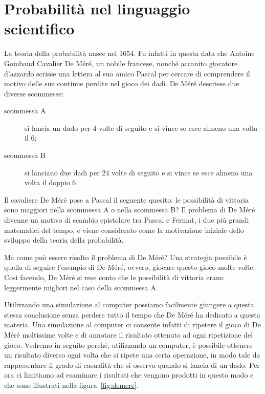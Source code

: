 \section{Probabilità nel linguaggio scientifico}


La teoria della probabilità nasce nel 1654. 
Fu infatti in questa data che Antoine Gombaud Cavalier De Méré, un nobile francese, nonché accanito giocatore d'azzardo scrisse una lettera al suo amico Pascal per cercare di comprendere il motivo delle sue continue perdite nel gioco dei dadi.
De Méré descrisse due diverse scommesse: 

\begin{description}
\item[scommessa A] si lancia un dado per 4 volte di seguito e si vince se esce almeno una volta il 6;
\item[scommessa B] si lanciano due dadi per 24 volte di seguito e si vince se esce almeno una volta il doppio 6.
\end{description}
Il cavaliere De Méré pose a Pascal il seguente quesito: le possibilità di vittoria sono maggiori nella scommessa A o nella scommessa B?
Il problema di De Méré divenne un motivo di scambio epistolare tra Pascal e Fermat, i due più grandi matematici del tempo, e viene considerato come la motivazione iniziale dello sviluppo  della teoria della probabilità.

Ma come può essere risolto il problema di De Méré?
Una strategia possibile è quella di seguire l'esempio di De Méré, ovvero, giocare questo gioco molte volte.
Così facendo, De Méré si rese conto che le possibilità di vittoria erano leggermente migliori nel caso della scommessa A.

Utilizzando una simulazione al computer possiamo facilmente giungere a questa stessa conclusione senza perdere tutto il tempo che De Méré ha dedicato a questa materia.
Una simulazione al computer ci consente infatti di ripetere il gioco di De Méré moltissime volte e di annotare il risultato ottenuto ad ogni ripetizione del gioco.
Vedremo in seguito perché, utilizzando un computer, è possibile ottenere un risultato diverso ogni volta che si ripete una certa operazione, in modo tale da rappresentare il grado di casualità che si osserva quando si lancia di un dado.
Per ora ci limitiamo ad esaminare i risultati che vengono prodotti in questo modo e che sono illustrati nella figura~\ref{fig:demere}.

